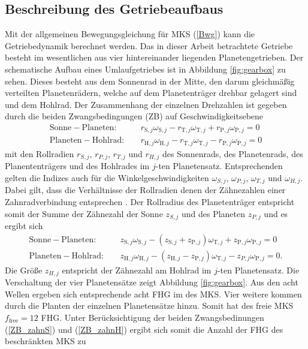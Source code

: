 \subsection{Beschreibung des Getriebeaufbaus}
Mit der allgemeinen Bewegungsgleichung für MKS (\ref{Bwg}) kann die Getriebedynamik berechnet werden. Das in dieser Arbeit betrachtete Getriebe besteht im wesentlichen aus vier hintereinander liegenden Planetengetrieben. Der schematische Aufbau eines Umlaufgetriebes ist in Abbildung \ref{fig:gearbox} zu sehen. Dieses besteht aus dem Sonnenrad in der Mitte, den darum gleichmäßig verteilten Planetenrädern, welche auf dem Planetenträger drehbar gelagert sind und dem Hohlrad. Der Zusammenhang der einzelnen Drehzahlen ist gegeben durch die beiden Zwangsbedingungen (ZB) auf Geschwindigkeitsebene
\begin{align}
\mathrm{Sonne - Planeten}:\quad &r_{\mathrm{S},j}\omega_{\mathrm{S},j} - r_{\mathrm{T},j}\omega_{\mathrm{T},j}+ r_{\mathrm{P},j}\omega_{\mathrm{P},j}=0 \\
\mathrm{Planeten - Hohlrad}:\quad &r_{\mathrm{H},j}\omega_{\mathrm{H},j} - r_{\mathrm{T},j}\omega_{\mathrm{T},j}- r_{\mathrm{P},j}\omega_{\mathrm{P},j}=0
\end{align}
mit den Rollradien $r_{S,j}$, $r_{P,j}$, $r_{T,j}$ und $r_{H,j}$ des Sonnenrads, des Planetenrads, des Planententrägers und des Hohlrades im $j$-ten Planetensatz. Entsprechenden gelten die Indizes auch für die Winkelgeschwindigkeiten $\omega_{S,j}$, $\omega_{P,j}$, $\omega_{T,j}$ und $\omega_{H,j}$.
Dabei gilt, dass die Verhältnisse der Rollradien denen der Zähnezahlen einer Zahnradverbindung entsprechen \cite[S. 114f]{Fischer.2016}. Der Rollradius des Planetenträger entspricht somit der Summe der Zähnezahl der Sonne $z_{S,j}$ und des Planeten $z_{P,j}$ und es ergibt sich
\begin{align}\label{ZB_zahnS}
\mathrm{Sonne - Planeten}:\quad &z_{\mathrm{S},j}\omega_{\mathrm{S},j} - (z_{\mathrm{S},j} + z_{\mathrm{P},j})\omega_{\mathrm{T},j}+ z_{\mathrm{P},j}\omega_{\mathrm{P},j}=0 \\ \label{ZB_zahnH}
\mathrm{Planeten - Hohlrad}:\quad &z_{\mathrm{H},j}\omega_{\mathrm{H},j} - (z_{\mathrm{H},j} - z_{\mathrm{P},j})\omega_{\mathrm{T},j}- z_{P,j}\omega_{\mathrm{P},j}=0.
\end{align}
Die Größe  $z_{H,j}$ entspricht der Zähnezahl am Hohlrad im $j$-ten Planetensatz. Die Verschaltung der vier Planetensätze zeigt Abbildung \ref{fig:gearbox}. Aus den acht Wellen ergeben sich entsprechende acht FHG im des MKS. Vier weitere kommen durch die Planten der einzelnen Planetensätze hinzu. Somit hat des freie MKS $f_{\textrm{free}}=12$ FHG. Unter Berücksichtigung der beiden Zwangsbedinungen (\ref{ZB_zahnS}) und (\ref{ZB_zahnH}) ergibt sich somit die Anzahl der FHG des beschränkten MKS zu
